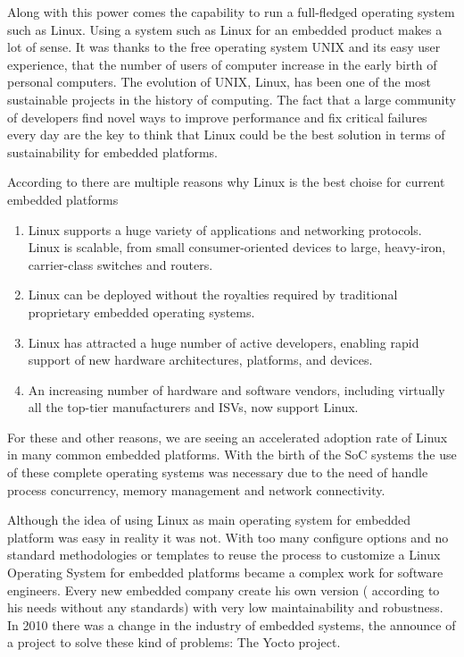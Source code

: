 Along with this power comes the capability to run a full-fledged operating
system such as Linux. Using a system such as Linux for an embedded product
makes a lot of sense. It was thanks to the free operating system UNIX and its
easy user experience, that the number of users of computer increase in the
early birth of personal computers. The evolution of UNIX, Linux, has been one
of the most sustainable projects in the history of computing. The fact that a
large community of developers find novel ways to improve performance and fix
critical failures every day are the key to think that Linux could be the best
solution in terms of sustainability for embedded platforms.

According to \cite{Hallinan} there are multiple reasons why Linux is the best choise
for current embedded platforms 

\begin{enumerate}
\item Linux supports a huge variety of applications and networking protocols.
Linux is scalable, from small consumer-oriented devices to large, heavy-iron,
carrier-class switches and routers.
\item Linux can be deployed without the royalties required by traditional proprietary
embedded operating systems.
\item Linux has attracted a huge number of active developers, enabling rapid support
of new hardware architectures, platforms, and devices.
\item An increasing number of hardware and software vendors, including virtually all
the top-tier manufacturers and ISVs, now support Linux.
\end{enumerate}

For these and other reasons, we are seeing an accelerated adoption rate of
Linux in many common embedded platforms. With the birth of the SoC systems the
use of these complete operating systems was necessary due to the need of handle
process concurrency, memory management and network connectivity.

Although the idea of using Linux as main operating system for embedded platform
was easy in reality it was not. With too many configure options and no standard
methodologies or templates to reuse the process to customize a Linux Operating
System for embedded platforms became a complex work for software engineers.
Every new embedded company create his own version ( according to his needs
without any standards) with very low maintainability and robustness. In 2010
there was a change in the industry of embedded systems, the announce of a
project to solve these kind of problems: The Yocto project.

